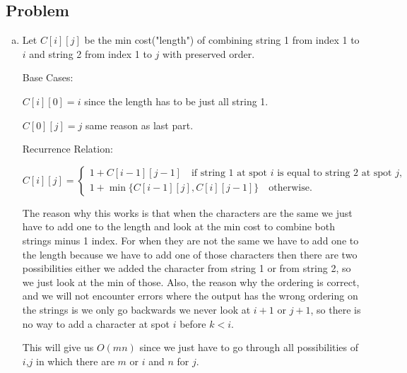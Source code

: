 \documentclass[12pt, letterpaper]{article}
\theoremstyle{definition}
\newcounter{problem}
\newcommand{\q}{
    \newpage %
    \stepcounter{problem} %
    \subsection*{Problem \arabic{problem}} %
}
\renewcommand{\t}[1]{\text{#1}}
\begin{document}
\q
\begin{enumerate}[(a)]
    \item Let $C[i][j]$ be the min cost("length") of combining string 1 from index 1 to $i$ and string 2 from index 1 to $j$ with preserved order.

    Base Cases:

    $C[i][0]=i$ since the length has to be just all string 1.

    $C[0][j]=j$ same reason as last part.
    
    Recurrence Relation:

    \begin{equation*}
        C[i][j]=\begin{cases}
            1 + C[i-1][j-1] \quad \t{if  string 1 at spot $i$ is equal to string 2 at spot $j$,}\\
            1 + \min\{C[i-1][j],C[i][j-1]\} \quad \t{otherwise.}
        \end{cases}
    \end{equation*}

    The reason why this works is that when the characters are the same we just have to add one to the length and look at the min cost to combine both strings minus 1 index. For when they are not the same we have to add one to the length because we have to add one of those characters then there are two possibilities either we added the character from string 1 or from string 2, so we just look at the min of those.
    Also, the reason why the ordering is correct, and we will not encounter errors where the output has the wrong ordering on the strings is we only go backwards we never look at $i+1$ or $j+1$, so there is no way to add a character at spot $i$ before $k < i$.
    
    This will give us $O(mn)$ since we just have to go through all possibilities of $i$,$j$ in which there are $m$ or $i$ and $n$ for $j$.


\end{enumerate}
\end{document}
